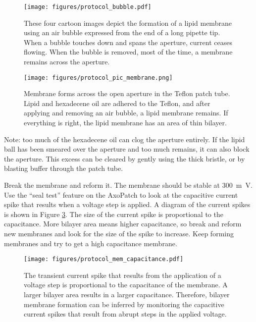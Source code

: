 \begin{figure}[h]
\begin{centering}
\texttt{[image: figures/protocol\_bubble.pdf]}
\caption[Establishing a lipid membrane with a bubble]{These four cartoon images depict the formation of a lipid membrane using an air bubble expressed from the end of a long pipette tip.  When a bubble touches down and spans the aperture, current ceases flowing.  When the bubble is removed, most of the time, a membrane remains across the aperture.}
\label{fig:protocol_bubble}
\end{centering}
\end{figure}

\begin{figure}[h]
\begin{centering}
\texttt{[image: figures/protocol\_pic\_membrane.png]}
\caption[Diagram of membrane on Teflon patch tube]{Membrane forms across the open aperture in the Teflon patch tube.  Lipid and hexadecene oil are adhered to the Teflon, and after applying and removing an air bubble, a lipid membrane remains.  If everything is right, the lipid membrane has an area of thin bilayer.}
\label{fig:protocol_membrane}
\end{centering}
\end{figure}

Note: too much of the hexadecene oil can clog the aperture entirely.  If the lipid ball has been smeared over the aperture and too much remains, it can also block the aperture.  This excess can be cleared by gently using the thick bristle, or by blasting buffer through the patch tube.

Break the membrane and reform it.  The membrane should be stable at \SI{300}{\m\V}.  Use the ``seal test” feature on the AxoPatch to look at the capacitive current spike that results when a voltage step is applied.  A diagram of the current spikes is shown in Figure \ref{fig:protocol_capacitance}.  The size of the current spike is proportional to the capacitance.  More bilayer area means higher capacitance, so break and reform new membranes and look for the size of the spike to increase.  Keep forming membranes and try to get a high capacitance membrane.

\begin{figure}[h]
\begin{centering}
\texttt{[image: figures/protocol\_mem\_capacitance.pdf]}
\caption[Monitoring membrane capacitance]{The transient current spike that results from the application of a voltage step is proportional to the capacitance of the membrane.  A larger bilayer area results in a larger capacitance.  Therefore, bilayer membrane formation can be inferred by monitoring the capacitive current spikes that result from abrupt steps in the applied voltage.}
\label{fig:protocol_capacitance}
\end{centering}
\end{figure}



